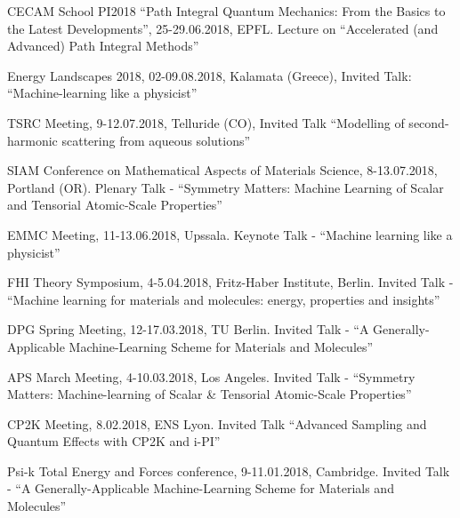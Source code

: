 \begin{enumerate}
{\item CECAM School PI2018 “Path Integral Quantum Mechanics: From the Basics to the Latest Developments”, 25-29.06.2018, EPFL. Lecture on “Accelerated (and Advanced) Path Integral Methods”
\item Energy Landscapes 2018, 02-09.08.2018, Kalamata (Greece), Invited Talk: “Machine-learning like a physicist”
\item TSRC Meeting, 9-12.07.2018, Telluride (CO), Invited Talk “Modelling of second-harmonic scattering from aqueous solutions”
\item SIAM Conference on Mathematical Aspects of Materials Science, 8-13.07.2018, Portland (OR). Plenary Talk - “Symmetry Matters: Machine Learning of Scalar and Tensorial Atomic-Scale Properties”
\item EMMC Meeting, 11-13.06.2018, Upssala. Keynote Talk - “Machine learning like a physicist”
\item FHI Theory Symposium, 4-5.04.2018, Fritz-Haber Institute, Berlin. Invited Talk - “Machine learning for materials and molecules: energy, properties and insights”
\item DPG Spring Meeting, 12-17.03.2018, TU Berlin. Invited Talk - “A Generally-Applicable Machine-Learning Scheme for Materials and Molecules”
\item APS March Meeting, 4-10.03.2018, Los Angeles. Invited Talk - “Symmetry Matters: Machine-learning of Scalar \&{} Tensorial Atomic-Scale Properties”
\item CP2K Meeting, 8.02.2018, ENS Lyon. Invited Talk “Advanced Sampling and Quantum Effects with CP2K and i-PI”
\item Psi-k Total Energy and Forces conference, 9-11.01.2018, Cambridge. Invited Talk - “A Generally-Applicable Machine-Learning Scheme for Materials and Molecules”
}
\end{enumerate}
